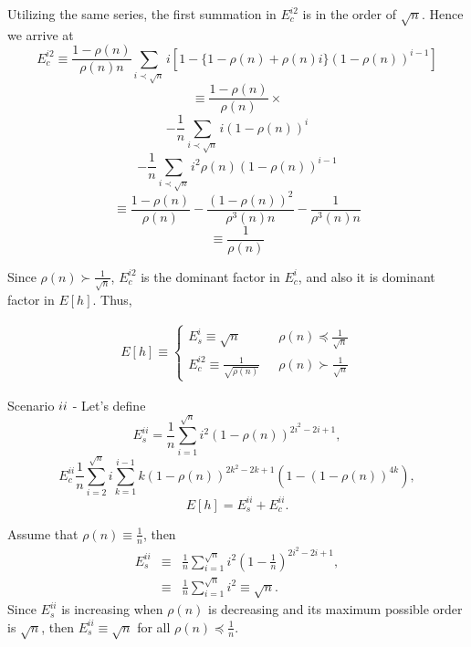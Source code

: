 \documentclass[journal]{IEEEtran}
\theoremstyle{plain}
\theoremstyle{remark}
\begin{document}
\begin{IEEEproof}
Utilizing the same series, the first summation in $E_c^{i2}$ is in the order of $\sqrt{n}$. Hence we arrive at
\begin{equation}
E_c^{i2}\equiv \frac{1-\rho(n)}{\rho(n)n}\sum_{i\prec \sqrt{n}} i[1-\{1-\rho(n)+\rho(n)i\}(1-\rho(n))^{i-1}] \nonumber 
\end{equation}
\begin{equation}
\equiv \frac{1-\rho(n)}{\rho(n)} \times \nonumber
\end{equation}
\begin{equation}
- \frac{1}{n}\sum_{i\prec \sqrt{n}} i(1-\rho(n))^i \nonumber 
\end{equation}
\begin{equation}
- \frac{1}{n}\sum_{i\prec \sqrt{n}} i^2\rho(n)(1-\rho(n))^{i-1} \nonumber 
\end{equation}
\begin{equation}
\equiv \frac{1-\rho(n)}{\rho(n)}-\frac{(1-\rho(n))^2}{\rho^3(n)n}-\frac{1}{\rho^3(n)n} \nonumber 
\end{equation}
\begin{equation}
\equiv \frac{1}{\rho(n)}
\end{equation}

Since  $\rho(n)\succ \frac{1}{\sqrt{n}}$, $E_c^{i2}$ is the dominant factor in $E_c^i$, and also it is dominant factor in $E[h]$. Thus,

\begin{eqnarray}
E[h]\equiv \left\{\begin{array}{ll}
					E_s^i \equiv \sqrt{n}& \ \ \  \rho(n)\preceq \frac{1}{\sqrt{n}} \\
					E_c^{i2}\equiv \frac{1}{ \sqrt{\rho(n)}}& \ \ \  \rho(n)\succ \frac{1}{\sqrt{n}}
			\end{array}\right . 
\end{eqnarray}

Scenario $\romannumeral 2$ - Let's define 
\begin{equation}
E_s^{ii}= \frac{1}{n}\sum_{i=1}^{\sqrt{n}} i^2(1-\rho(n))^{2i^2-2i+1}, \nonumber 
\end{equation}
\begin{equation}
E_c^{ii} \frac{1}{n}\sum_{i=2}^{\sqrt{n}}i\sum_{k=1}^{i-1}k(1-\rho(n))^{2k^2-2k+1}(1-(1-\rho(n))^{4k}), \nonumber 
\end{equation}
\begin{equation}
E[h]= E_s^{ii}+E_c^{ii}.
\end{equation}

Assume that $\rho(n)\equiv \frac{1}{n}$, then 
\begin{eqnarray}
E_s^{ii}&\equiv& \frac{1}{n}\sum_{i=1}^{\sqrt{n}} i^2(1-\frac{1}{n})^{2i^2-2i+1}, \nonumber \\
&\equiv& \frac{1}{n}\sum_{i=1}^{\sqrt{n}} i^2 \equiv \sqrt{n}.
\end{eqnarray}
Since $E_s^{ii}$ is increasing when  $\rho(n)$ is decreasing and its maximum possible order is $\sqrt{n}$, then $E_s^{ii}\equiv \sqrt{n}$ for all $\rho(n) \preceq \frac{1}{n}$.


\end{IEEEproof}
\end{document}
